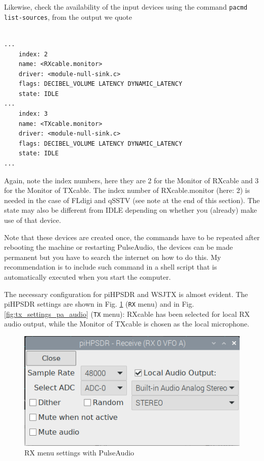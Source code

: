 \documentclass[12pt]{book}
\def\bltt#1{\texttt{\color{blue}#1}}
\def\pH{pi\-HPSDR }
\begin{document}
Likewise, check the availability of the input devices using
the command \texttt{pacmd list-sources}, from the output we quote

\begin{small}
\begin{verbatim}

...
    index: 2
	name: <RXcable.monitor>
	driver: <module-null-sink.c>
	flags: DECIBEL_VOLUME LATENCY DYNAMIC_LATENCY
	state: IDLE
...
    index: 3
	name: <TXcable.monitor>
	driver: <module-null-sink.c>
	flags: DECIBEL_VOLUME LATENCY DYNAMIC_LATENCY
	state: IDLE
...
\end{verbatim}
\end{small}

Again, note the index numbers, here they are 2 for the Monitor of RXcable and 3 for the Monitor
of TXcable. The index number of RXcable.monitor (here: 2) is needed in the
case of FLdigi and qSSTV (see note at the end of this section).
The state may also be different from IDLE depending on whether
you (already) make use of that device.

Note that these devices are created once, the commands have to be repeated after rebooting
the machine or restarting PulseAudio, the devices can be made permanent but you have to
search the internet on how to do this. My recommendation is to include such command in a
shell script that is automatically executed when you start the computer.

The necessary configuration for \pH and WSJTX is  almost evident. The
\pH settings are shown in Fig. \ref{fig:rx_settings_pa_audio} (\bltt{RX} menu)
and in Fig. \ref{fig:tx_settings_pa_audio} (\bltt{TX} menu): RXcable has been selected
for local RX audio output, while the Monitor of TXcable is chosen as the local
microphone.

\begin{figure}[ht]
\center
\includegraphics[width=12cm]{rx_settings_pa_audio.png}
\caption{RX menu settings with PulseAudio}
\label{fig:rx_settings_pa_audio}
\end{figure}
\end{document}
